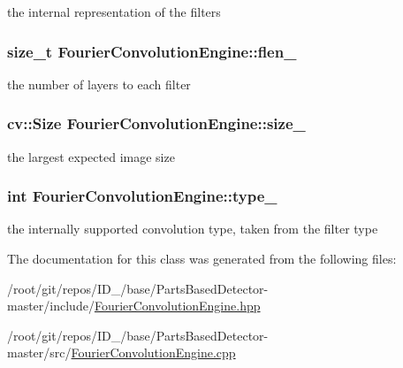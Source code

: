 the internal representation of the filters 

\hypertarget{classFourierConvolutionEngine_ab4322f51ce4a18ab5b7439abb5c96aef}{
\subsubsection[{flen\-\_\-}]{\setlength{\rightskip}{0pt plus 5cm}size\-\_\-t {\bf \-Fourier\-Convolution\-Engine\-::flen\-\_\-}}}\label{classFourierConvolutionEngine_ab4322f51ce4a18ab5b7439abb5c96aef}


the number of layers to each filter 

\hypertarget{classFourierConvolutionEngine_a2375ea1729ad2fe45fe6204130f3f39f}{
\subsubsection[{size\-\_\-}]{\setlength{\rightskip}{0pt plus 5cm}cv\-::\-Size {\bf \-Fourier\-Convolution\-Engine\-::size\-\_\-}}}\label{classFourierConvolutionEngine_a2375ea1729ad2fe45fe6204130f3f39f}


the largest expected image size 

\hypertarget{classFourierConvolutionEngine_a3e213d98d690b295eaa2866618f17933}{
\subsubsection[{type\-\_\-}]{\setlength{\rightskip}{0pt plus 5cm}int {\bf \-Fourier\-Convolution\-Engine\-::type\-\_\-}}}\label{classFourierConvolutionEngine_a3e213d98d690b295eaa2866618f17933}


the internally supported convolution type, taken from the filter type 



\-The documentation for this class was generated from the following files\-:\begin{DoxyCompactItemize}
\item 
/root/git/repos/\-I\-D\-\_/base/\-Parts\-Based\-Detector-\/master/include/\hyperlink{FourierConvolutionEngine_8hpp}{\-Fourier\-Convolution\-Engine.\-hpp}\item 
/root/git/repos/\-I\-D\-\_/base/\-Parts\-Based\-Detector-\/master/src/\hyperlink{FourierConvolutionEngine_8cpp}{\-Fourier\-Convolution\-Engine.\-cpp}\end{DoxyCompactItemize}
